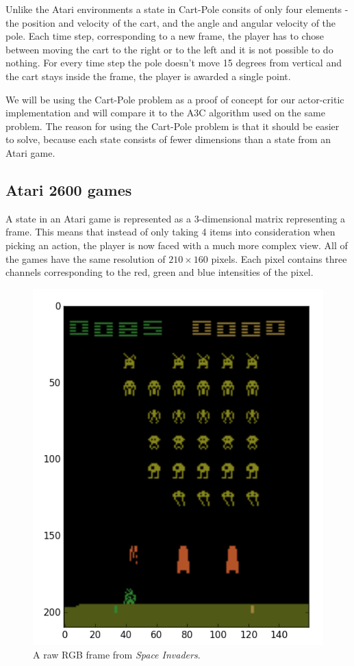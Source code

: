 \documentclass[11pt]{article}
\begin{document}
Unlike the Atari environments a state in Cart-Pole consits of only four elements - the position and velocity of the cart, and the
angle and angular velocity of the pole.
Each time step, corresponding to a new frame, the player has to chose between moving the cart to the right or to the left and it is not possible
to do nothing.
For every time step the pole doesn't move 15 degrees from vertical and
the cart stays inside the frame, the player is awarded a single point.

We will be using the Cart-Pole problem as a proof of concept for our actor-critic implementation and will
compare it to the A3C algorithm used on the same problem.
The reason for using the Cart-Pole problem is that it should be easier
to solve, because each state consists of fewer dimensions than a state
from an Atari game.


\subsection{Atari 2600 games}

A state in an Atari game is represented as a 3-dimensional matrix representing a
frame.
This means that instead of only taking 4 items into consideration when picking an action,
the player is now faced with a much more complex view. 
All of the games have the same resolution of $210 \times 160$ pixels.
Each pixel contains three channels corresponding to the red, green and blue intensities of the pixel.
\begin{figure}[!h]
    \centering
    \includegraphics[scale=0.35]{include/space_invaders_1.png}
    \caption{A raw RGB frame from \textit{Space Invaders}.}
    \label{fig:si}
\end{figure}
\end{document}
